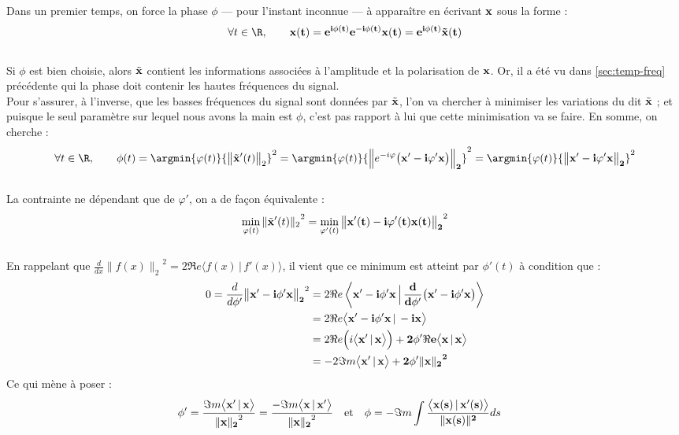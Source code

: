 Dans un premier temps, on force la phase $\phi$ --- pour l'instant inconnue --- à apparaître en écrivant $\bf{x}$ sous la forme :
\[\forall t\in\R,\qquad \bf{x}(t) = e^{i\phi(t)} e^{-i\phi(t)} \bf{x}(t) = e^{i\phi(t)} \Tilde{\bf{x}}(t)\]
\\
Si $\phi$ est bien choisie, alors $\Tilde{\bf{x}}$ contient les informations associées à l'amplitude et la polarisation de $\bf{x}$. Or, il a été vu dans \cref{sec:temp-freq} précédente qui la phase doit contenir les hautes fréquences du signal. 
\\
Pour s'assurer, à l'inverse, que les basses fréquences du signal sont données par $\Tilde{\bf{x}}$, l'on va chercher à minimiser les variations du dit $\Tilde{\bf{x}}$ ; et puisque le seul paramètre sur lequel nous avons la main est $\phi$, c'est pas rapport à lui que cette minimisation va se faire. En somme, on cherche :
\[\forall t\in\R,\qquad \phi(t) = \argmin{\varphi(t)}{\big\|\Tilde{\bf{x}}'(t)\big\|_2}^2 = \argmin{\varphi(t)}{\Big\|e^{-i\varphi}\big(\bf{x}' - i\varphi'\bf{x}\big)\Big\|_2}^2 = \argmin{\varphi(t)}{\big\|\bf{x}' - i\varphi'\bf{x}\big\|_2}^2\]
\\
La contrainte ne dépendant que de $\varphi'$, on a de façon équivalente :
\[\min_{\varphi(t)}{\|\Tilde{\bf{x}}'(t)\|_2}^2 = \min_{\varphi'(t)}{\big\|\bf{x}'(t) - i\varphi'(t) \bf{x}(t)\big\|_2}^2\]
\\
En rappelant que $\frac{d}{dx}{\big\|f(x)\big\|_2}^2 = 2\Re e\big\langle f(x)\,|\, f'(x)\big\rangle$, il vient que ce minimum est atteint par $\phi'(t)$ à condition que :
\begin{align*}
	0 = \frac{d}{d\phi'}{\big\| \bf{x}' - i\phi' \bf{x}\big\|_2}^2 
		&= 2\Re e\left\langle  \bf{x}' - i\phi' \bf{x} \,\Big|\,  \frac{d}{d\phi'}\big(\bf{x}' - i\phi' \bf{x}\big)\right\rangle \\
		&= 2\Re e\big\langle  \bf{x}' - i\phi' \bf{x} \,|\,  - i \bf{x}\big\rangle \\
		&= 2\Re e\Big(i\big\langle  \bf{x}' \,|\,  \bf{x}\big\rangle\Big) + 2\phi'\Re e\big\langle   \bf{x} \,|\,  \bf{x}\big\rangle\\
		&= -2\Im m\big\langle  \bf{x}' \,|\,  \bf{x}\big\rangle + 2\phi'{\| \bf{x}\|_2}^2
\end{align*}
Ce qui mène à poser :
\begin{align}
	\phi' &= \frac{\Im m\big\langle  \bf{x}' \,|\,  \bf{x}\big\rangle}{{\| \bf{x}\|_2}^2} = \frac{-\Im m\big\langle  \bf{x} \,|\,  \bf{x}'\big\rangle}{{\| \bf{x}\|_2}^2}  &  &\text{et}  &  \phi &= -\Im m\int \frac{\big\langle \bf{x}(s) \,|\, \bf{x}'(s) \big\rangle}{\|\bf{x}(s)\|^2} ds
\end{align}
\\ \\


